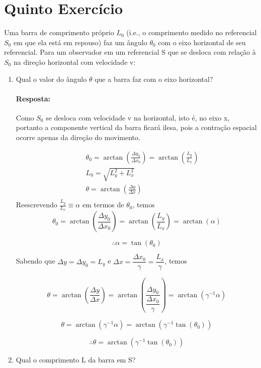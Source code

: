 \documentclass[10pt,a4paper]{article}
\begin{document}
	\section{Quinto Exercício}
	Uma barra de comprimento próprio $ L_0 $ (i.e., o comprimento medido no referencial $ S_0 $ em que ela está em repouso) faz um ângulo $ \theta_0 $ com o eixo
	horizontal de seu referencial. Para um observador em um referencial S que se desloca com relação à $ S_0 $ na direção horizontal com velocidade v:
	\begin{enumerate}
		\item Qual o valor do ângulo $ \theta $ que a barra faz com o eixo horizontal?
		
		\paragraph{Resposta:}
		Como $ S_0 $ se desloca com velocidade v na horizontal, isto é, no eixo x, portanto a componente vertical da barra ficará ilesa, pois a contração espacial ocorre apenas da direção do movimento.
		
		\begin{eqnarray}
			&& \theta_0 = \arctan\left(\frac{\Delta y_0}{\Delta x_0}\right) = \arctan\left(\frac{L_y}{L_x}\right)\nonumber \\
			&& L_0 = \sqrt{L_y^2+L_x^2} \nonumber\\
			&& \theta = \arctan\left(\frac{\Delta y}{\Delta x}\right) \nonumber \\
		\end{eqnarray}
		 Reescrevendo $ \frac{L_y}{L_x} \equiv \alpha$ em termos de $ \theta_0 $, temos
		 $$\theta_0 = \arctan\left(\frac{\Delta y_0}{\Delta x_0}\right) = \arctan\left(\frac{L_y}{L_x}\right) =  \arctan (\alpha)$$
		 
		 $$\therefore \alpha = \tan (\theta_0)$$
		 
		 Sabendo que $ \Delta y = \Delta y_0 = L_y $ e $\Delta x = \dfrac{\Delta x_0}{\gamma} =\dfrac{L_x}{\gamma} $, temos
		 
		 $$ \theta = \arctan\left(\frac{\Delta y}{\Delta x}\right) = \arctan\left(\frac{\Delta y_0}{ \dfrac{\Delta x_0}{\gamma}}\right) = \arctan(\gamma^{-1}\alpha)$$
		 
		 $$\theta = \arctan(\gamma^{-1}\alpha) = \arctan(\gamma^{-1}\tan (\theta_0))$$
		 
		$$ \therefore \theta  = \arctan(\gamma^{-1}\tan (\theta_0))$$
		
		\item Qual o comprimento L da barra em S?

\end{enumerate}
\end{document}

